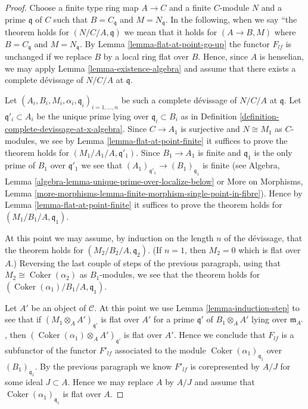 \documentclass[10pt,a4paper]{amsart}
\theoremstyle{plain}
\theoremstyle{definition}
\theoremstyle{remark}
\numberwithin{equation}{subsection}
\def\Coker{\mathop{\mathrm{Coker}}}
\begin{document}
\begin{proof}
Choose a finite type ring map $A \to C$ and a finite $C$-module $N$
and a prime $\mathfrak q$ of $C$ such that $B = C_{\mathfrak q}$
and $M = N_{\mathfrak q}$. In the following, when we say
``the theorem holds for $(N/C/A, \mathfrak q)$ we mean that
it holds for $(A \to B, M)$ where $B = C_{\mathfrak q}$ and
$M = N_{\mathfrak q}$. By
Lemma \ref{lemma-flat-at-point-go-up}
the functor $F_{lf}$ is unchanged if we replace $B$ by a local ring
flat over $B$. Hence, since $A$ is henselian, we may apply
Lemma \ref{lemma-existence-algebra}
and assume that there exists a complete d\'evissage of
$N/C/A$ at $\mathfrak q$.

\medskip\noindent
Let $(A_i, B_i, M_i, \alpha_i, \mathfrak q_i)_{i = 1, \ldots, n}$
be such a complete d\'evissage of $N/C/A$ at $\mathfrak q$. Let
$\mathfrak q'_i \subset A_i$ be the unique prime lying over
$\mathfrak q_i \subset B_i$ as in
Definition \ref{definition-complete-devissage-at-x-algebra}.
Since $C \to A_1$ is surjective and $N \cong M_1$ as $C$-modules,
we see by
Lemma \ref{lemma-flat-at-point-finite}
it suffices to prove the theorem holds for $(M_1/A_1/A, \mathfrak q'_1)$.
Since $B_1 \to A_1$ is finite and $\mathfrak q_1$ is the only prime
of $B_1$ over $\mathfrak q'_1$ we see that
$(A_1)_{\mathfrak q'_1} \to (B_1)_{\mathfrak q_1}$ is finite (see
Algebra, Lemma \ref{algebra-lemma-unique-prime-over-localize-below} or
More on Morphisms,
Lemma \ref{more-morphisms-lemma-finite-morphism-single-point-in-fibre}).
Hence by
Lemma \ref{lemma-flat-at-point-finite}
it suffices to prove the theorem holds for $(M_1/B_1/A, \mathfrak q_1)$.

\medskip\noindent
At this point we may assume, by induction on the length $n$ of the
d\'evissage, that the theorem holds for $(M_2/B_2/A, \mathfrak q_2)$.
(If $n = 1$, then $M_2 = 0$ which is flat over $A$.)
Reversing the last couple of steps of the previous paragraph, using
that $M_2 \cong \Coker(\alpha_2)$ as $B_1$-modules, we see
that the theorem holds for $(\Coker(\alpha_1)/B_1/A, \mathfrak q_1)$.

\medskip\noindent
Let $A'$ be an object of $\mathcal{C}$. At this point we use
Lemma \ref{lemma-induction-step}
to see that if $(M_1 \otimes_A A')_{\mathfrak q'}$ is flat
over $A'$ for a prime $\mathfrak q'$ of $B_1 \otimes_A A'$
lying over $\mathfrak m_{A'}$, then
$(\Coker(\alpha_1) \otimes_A A')_{\mathfrak q'}$ is flat over $A'$.
Hence we conclude that $F_{lf}$ is a subfunctor of the
functor $F'_{lf}$ associated to the module
$\Coker(\alpha_1)_{\mathfrak q_1}$ over $(B_1)_{\mathfrak q_1}$.
By the previous paragraph we know $F'_{lf}$ is corepresented by
$A/J$ for some ideal $J \subset A$. Hence we may replace $A$ by
$A/J$ and assume that $\Coker(\alpha_1)_{\mathfrak q_1}$ is
flat over $A$.


\end{proof}
\end{document}
